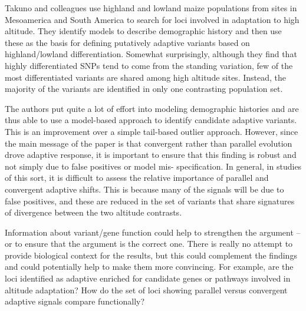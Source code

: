 \documentclass[onecolumn,oneside,letterpaper]{article}
\begin{document}
Takuno and colleagues use highland and lowland maize populations from sites in Mesoamerica and South America to search for loci involved in adaptation to high altitude.  They identify models to describe demographic history and then use these as the basis for defining putatively adaptive variants based on highland/lowland differentiation.  Somewhat surprisingly, although they find that highly differentiated SNPs tend to come from the standing variation, few of the most differentiated variants are shared among high altitude sites. Instead, the majority of the variants are identified in only one contrasting population set.   

The authors put quite a lot of effort into modeling demographic histories and are thus able to use a model-based approach to identify candidate adaptive variants.  This is an improvement over a simple tail-based outlier approach.  However, since the main message of the paper is that convergent rather than parallel evolution drove adaptive response, it is important to ensure that this finding is robust and not simply due to false positives or model mis- specification.  In general, in studies of this sort, it is difficult to assess the relative importance of parallel and convergent adaptive shifts. This is because many of the signals will be due to false positives, and these are reduced in the set of variants that share signatures of divergence between the two altitude contrasts.  

Information about variant/gene function could help to strengthen the argument -- or to ensure that the argument is the correct one.  There is really no attempt to provide biological context for the results, but this could complement the findings and could potentially help to make them more convincing.  For example, are the loci identified as adaptive enriched for candidate genes or pathways involved in altitude adaptation? How do the set of loci showing parallel versus convergent adaptive signals compare functionally?   
\end{document}
